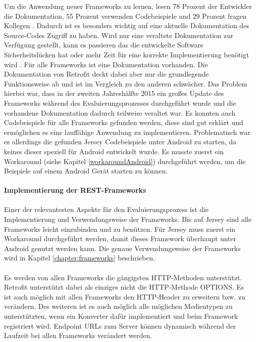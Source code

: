 Um die Anwendung neuer Frameworks zu lernen, lesen 78 Prozent der Entwickler die Dokumentation, 55 Prozent verwenden Codebeispiele und 29 Prozent fragen Kollegen \cite{robillard:apis}. Dadurch ist es besonders wichtig auf eine aktuelle Dokumentation des Source-Codes Zugriff zu haben. Wird nur eine veraltete Dokumentation zur Verfügung gestellt, kann es passieren das die entwickelte Software Sicherheitslücken hat oder mehr Zeit für eine korrekte Implementierung benötigt wird \cite{lethbridge:documentation}. Für alle Frameworks ist eine Dokumentation vorhanden. Die Dokumentation von Retrofit deckt dabei aber nur die grundlegende Funktionsweise ab und ist im Vergleich zu den anderen schwächer. Das Problem hierbei war, dass in der zweiten Jahreshälfte 2015 ein großes Update des Frameworks während des Evaluierungsprozesses durchgeführt wurde und die vorhandene Dokumentation dadurch teilweise veraltet war. Es konnten auch Codebeispiele für alle Frameworks gefunden werden, diese sind gut erklärt und ermöglichen es eine lauffähige Anwendung zu implementieren. Problematisch war es allerdings die gefunden Jersey Codebeispiele unter Android zu starten, da keines dieser speziell für Android entwickelt wurde. Es musste zuerst ein Workaround (siehe Kapitel \ref{workaroundAndroid}) durchgeführt werden, um die Beispiele auf einem Android Gerät starten zu können.
\\\\
{\large \textbf{Implementierung der REST-Frameworks}}\\\\
Einer der relevantesten Aspekte für den Evaluierungsprozess ist die Implementierung und Verwendungsweise der Frameworks. Bis auf Jersey sind alle Frameworks leicht einzubinden und zu benützen. Für Jersey muss zuerst ein Workaround durchgeführt werden, damit dieses Framework überhaupt unter Android genutzt werden kann. Die genaue Verwendungsweise der Frameworks wird in Kapitel \ref{chapter:frameworks} beschrieben.
\\\\
Es werden von allen Frameworks die gängigsten HTTP-Methoden unterstützt. Retrofit unterstützt dabei als einziges nicht die HTTP-Methode OPTIONS. Es ist auch möglich mit allen Frameworks den HTTP-Header zu erweitern bzw. zu verändern. Des weiteren ist es auch möglich alle möglichen Medientypen zu unterstützten, wenn ein Konverter dafür implementiert und beim Framework registriert wird. Endpoint URLs zum Server können dynamisch während der Laufzeit bei allen Frameworks verändert werden. 
\\\\
